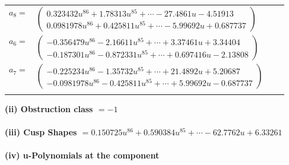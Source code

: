 \documentclass[1p]{elsarticle_modified}
\theoremstyle{definition}
\begin{document}
\begin{tabular}{m{7pt} m{180pt} m{7pt} m{180pt} }
\flushright $a_{8}=$&$\begin{pmatrix}0.323432 u^{86}+1.78313 u^{85}+\cdots-27.4861 u-4.51913\\0.0981978 u^{86}+0.425811 u^{85}+\cdots-5.99692 u+0.687737\end{pmatrix}$ \\
\flushright $a_{6}=$&$\begin{pmatrix}-0.356479 u^{86}-2.16611 u^{85}+\cdots+3.37461 u+3.34404\\-0.187301 u^{86}-0.872331 u^{85}+\cdots+0.697416 u-2.13808\end{pmatrix}$ \\
\flushright $a_{7}=$&$\begin{pmatrix}-0.225234 u^{86}-1.35732 u^{85}+\cdots+21.4892 u+5.20687\\-0.0981978 u^{86}-0.425811 u^{85}+\cdots+5.99692 u-0.687737\end{pmatrix}$\\&\end{tabular}
\flushleft \textbf{(ii) Obstruction class $= -1$}\\~\\
\flushleft \textbf{(iii) Cusp Shapes $= 0.150725 u^{86}+0.590384 u^{85}+\cdots-62.7762 u+6.33261$}\\~\\
\newpage\renewcommand{\arraystretch}{1}
\flushleft \textbf{(iv) u-Polynomials at the component}\newline \\
\end{document}

